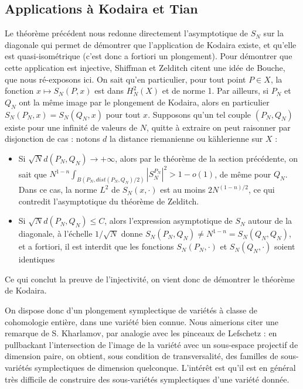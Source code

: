 \subsection{Applications à Kodaira et Tian}
	Le théorème précédent nous redonne directement l'asymptotique de $S_N$ sur la diagonale qui permet de démontrer que l'application de Kodaira existe, et qu'elle est quasi-isométrique (c'est donc a fortiori un plongement). Pour démontrer que cette application est injective, Shiffman et Zelditch citent une idée de Bouche, que nous ré-exposons ici. On sait qu'en particulier, pour tout point $P \in X$, la fonction $x \mapsto S_N(P,x)$ est dans $H^2_N(X)$ et de norme 1. Par ailleurs, si $P_N$ et $Q_N$ ont la même image par le plongement de Kodaira, alors en particulier $S_N(P_N,x)=S_N(Q_N,x)$ pour tout $x$. Supposons qu'un tel couple $(P_N,Q_N)$ existe pour une infinité de valeurs de $N$, quitte à extraire on peut raisonner par disjonction de cas : notons $d$ la distance riemanienne ou k\"ahlerienne sur $X$ :
	
	\begin{itemize}
		\item Si $\sqrt{N}d(P_N,Q_N) \to +\infty$, alors par le théorème de la section précédente, on sait que $N^{1-n}\int_{B(P_N,dist(P_N,Q_N)/2)}|S_N^{P_N}|^2 > 1-o(1)$, de même pour $Q_N$. Dans ce cas, la norme $L^2$ de $S_N(x,\cdot)$ est au moins $2N^{(1-n)/2}$, ce qui contredit l'asymptotique du théorème de Zelditch.
		\item Si $\sqrt{N}d(P_N,Q_N) \leq C$, alors l'expression asymptotique de $S_N$ autour de la diagonale, à l'échelle $1/\sqrt{N}$ donne $S_N(P_N,Q_N)\neq N^{1-n}=S_N(Q_N,Q_N)$, et a fortiori, il est interdit que les fonctions $S_N(P_N,\cdot)$ et $S_N(Q_N,\cdot)$ soient identiques
	\end{itemize}

Ce qui conclut la preuve de l'injectivité, on vient donc de démontrer le théorème de Kodaira.

On dispose donc d'un plongement symplectique de variétés à classe de cohomologie entière, dans une variété bien connue. Nous aimerions citer une remarque de S. Kharlamov, par analogie avec les pinceaux de Lefschetz : en pullbackant l'intersection de l'image de la variété avec un sous-espace projectif de dimension paire, on obtient, sous condition de transversalité, des familles de sous-variétés symplectiques de dimension quelconque. L'intérêt est qu'il est en général très difficile de construire des sous-variétés symplectiques d'une variété donnée. 